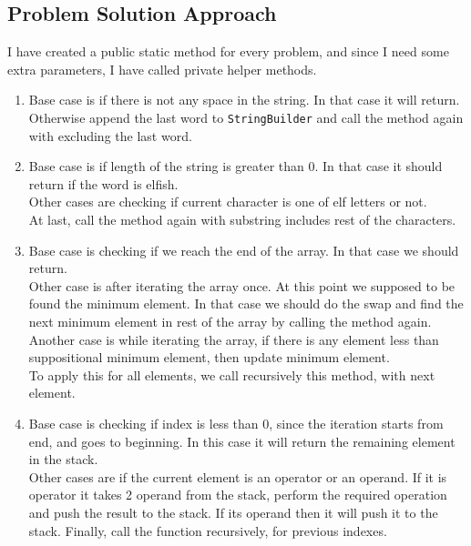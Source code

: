 \documentclass[a4paper]{article}
\begin{document}
\begin{large}
  \section{Problem Solution Approach}

  I have created a public static method for every problem, and since I need some extra parameters, I have called private helper methods. 

  \begin{enumerate}
    \item Base case is if there is not any space in the string. In that case it will return.\\
    Otherwise append the last word to \texttt{StringBuilder} and call the method again with excluding the last word.

    \item Base case is if length of the string is greater than 0. In that case it should return if the word is elfish.\\
    Other cases are checking if current character is one of elf letters or not.\\
    At last, call the method again with substring includes rest of the characters.

    \item Base case is checking if we reach the end of the array. In that case we should return.\\
    Other case is after iterating the array once. At this point we supposed to be found the minimum element. In that case we should do the swap and find the next minimum element in rest of the array by calling the method again.\\
    Another case is while iterating the array, if there is any element less than suppositional minimum element, then update minimum element.\\
    To apply this for all elements, we call recursively this method, with next element.

    \item Base case is checking if index is less than 0, since the iteration starts from end, and goes to beginning. In this case it will return the remaining element in the stack.\\
    Other cases are if the current element is an operator or an operand. If it is operator it takes 2 operand from the stack, perform the required operation and push the result to the stack. If its operand then it will push it to the stack. Finally, call the function recursively, for previous indexes.


\end{enumerate}
\end{large}
\end{document}
